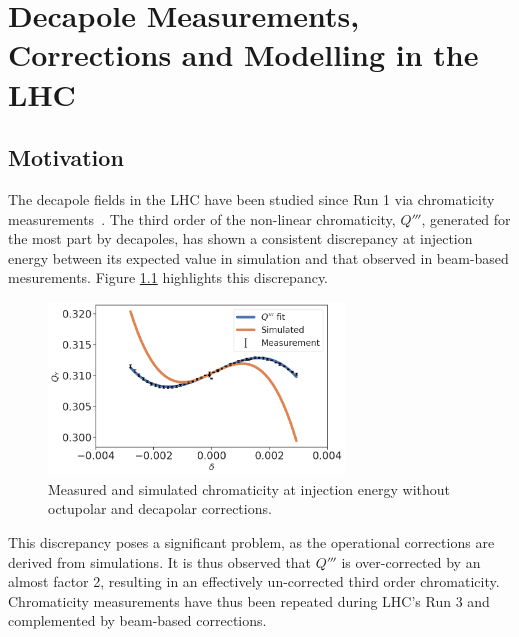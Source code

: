 \chapter{Decapole Measurements, Corrections and Modelling in the LHC}
\thumbforchapter{}
\chaptertoc{}
\newpage

\section{Motivation}

The decapole fields in the LHC have been studied since Run 1 via chromaticity 
measurements~\cite{maclean_non-linear_2011,maclean_commissioning_2016,maclean_measurement_2014}. 
The third order of the non-linear chromaticity, $Q'''$, generated for the most part by decapoles,
has shown a consistent discrepancy at injection energy between its expected value in simulation and
that observed in beam-based mesurements.
Figure \ref{fig:decapoles:bare_chroma_vs_simulations} highlights this discrepancy.

\begin{figure}[H]
    \centering
    \includegraphics[width=0.7\textwidth]{images/bare_chroma_simulated.png}
    \caption{Measured and simulated chromaticity at injection energy without octupolar and
             decapolar corrections.}
    \label{fig:decapoles:bare_chroma_vs_simulations}
\end{figure}

This discrepancy poses a significant problem, as the operational corrections are derived from
simulations. It is thus observed that $Q'''$ is over-corrected by an almost factor 2, resulting in
an effectively un-corrected third order chromaticity.
Chromaticity measurements have thus been repeated during LHC's Run 3 and complemented by beam-based
corrections.

